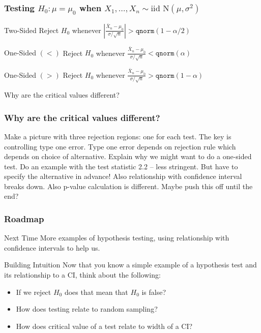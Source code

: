 \begin{frame}
  \frametitle{Testing $H_0\colon \mu = \mu_0$ when $X_1, \dots, X_n \sim \mbox{iid N}(\mu, \sigma^2)$}

  \begin{block}{Two-Sided}
    Reject $H_0$ whenever $\displaystyle \left|\frac{\bar{X}_n - \mu_0}{\sigma/\sqrt{n}}\right|> \texttt{qnorm}(1 - \alpha/2)$ 
  \end{block}

  \begin{block}{One-Sided $(<)$}
    Reject $H_0$ whenever $\displaystyle \frac{\bar{X}_n - \mu_0}{\sigma/\sqrt{n}} < \texttt{qnorm}(\alpha)$ 
  \end{block}

  \begin{block}{One-Sided $(>)$}
    Reject $H_0$ whenever $\displaystyle \frac{\bar{X}_n - \mu_0}{\sigma/\sqrt{n}} > \texttt{qnorm}(1 - \alpha)$ 
  \end{block}

  \vspace{1em}
  \alert{Why are the critical values different?}

\end{frame}
\begin{frame}
  \frametitle{Why are the critical values different?}
  Make a picture with three rejection regions: one for each test.
  The key is controlling type one error.
  Type one error depends on rejection rule which depends on choice of alternative.
  Explain why we might want to do a one-sided test.
  Do an example with the test statistic 2.2 -- less stringent.
  But have to specify the alternative in advance!
  Also relationship with confidence interval breaks down.
  Also p-value calculation is different.
  Maybe push this off until the end?
\end{frame}
\begin{frame}
  \frametitle{Roadmap}

  \begin{block}{Next Time}
    More examples of hypothesis testing, using relationship with confidence intervals to help us.
  \end{block}


  \pause

  \begin{block}{Building Intuition}
   Now that you know a simple example of a hypothesis test and its relationship to a CI, think about the following:
   \begin{itemize}
     \item If we reject $H_0$ does that mean that $H_0$ is false?
     \item How does testing relate to random sampling?
      \item How does critical value of a test relate to width of a CI?
   \end{itemize}
  \end{block}

\end{frame}
